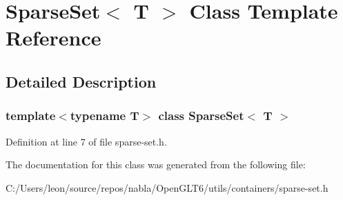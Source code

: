\hypertarget{class_sparse_set}{}\section{Sparse\+Set$<$ T $>$ Class Template Reference}
\label{class_sparse_set}


\subsection{Detailed Description}
\subsubsection*{template$<$typename T$>$\newline
class Sparse\+Set$<$ T $>$}



Definition at line 7 of file sparse-\/set.\+h.



The documentation for this class was generated from the following file\+:\begin{DoxyCompactItemize}
\item 
C\+:/\+Users/leon/source/repos/nabla/\+Open\+G\+L\+T6/utils/containers/sparse-\/set.\+h\end{DoxyCompactItemize}
